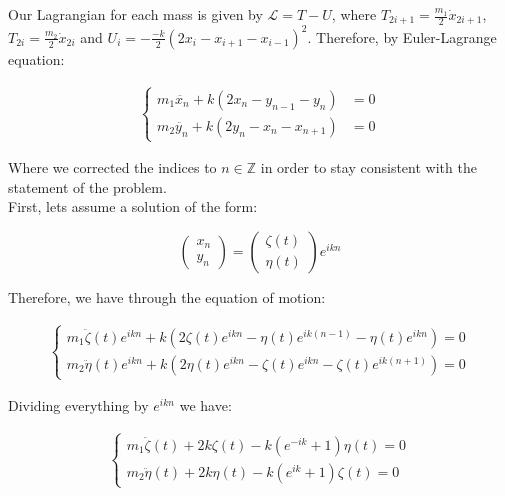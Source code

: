 \documentclass[
course = {{ITVO}},
quartile = {{1}},
assignment = 6,
name = {{Samir Salmen}},
studentnumber = {{NUSP: 11298636}},
email = {{samir.salmen@usp.br}},
firstexercise = 1
]{aga-homework}
\begin{document}
			
			
			
	\exercise
		\subexercise
			Our Lagrangian for each mass is given by $\mathcal{L} = T - U$, where $T_{2i+1} = \frac{m_1}{2}\dot{x}_{2i+1}$, $T_{2i} = \frac{m_2}{2}\dot{x}_{2i}$ and $U_i = -\frac{-k}{2}(2x_i - x_{i+1} - x_{i-1})^2$. Therefore, by Euler-Lagrange equation:
			
			
			\begin{align}
				\begin{cases}
					m_1\ddot{x_n} + k(2x_n - y_{n-1} - y_{n}) &= 0\\
					m_2\ddot{y_n} + k(2y_n - x_{n} - x_{n+1}) &= 0
				\end{cases}
			\end{align}
			
			Where we corrected the indices to $n \in \mathbb{Z}$ in order to stay consistent with the statement of the problem.\\
		\subexercise
			First, lets assume a solution of the form:
			
			\begin{equation}
				\begin{pmatrix}x_n\\y_n\end{pmatrix} =\begin{pmatrix}\zeta(t)\\\eta(t)\end{pmatrix} e^{ikn}
			\end{equation}
			
			Therefore, we have through the equation of motion:
			
			\begin{align}
				\begin{cases}	
					m_1\ddot{\zeta}(t)e^{ikn} + k(2\zeta(t)e^{ikn} - \eta(t)e^{ik(n-1)} - \eta(t)e^{ikn}) = 0\\
					m_2\ddot{\eta}(t)e^{ikn} + k(2\eta(t)e^{ikn} - \zeta(t)e^{ikn} - \zeta(t)e^{ik(n+1)}) = 0
				\end{cases}	
			\end{align}
			
			Dividing everything by $e^{ikn}$ we have:
			
			\begin{align}
				\begin{cases}
						m_1\ddot{\zeta}(t) + 2k\zeta(t)- k(e^{-ik} + 1)\eta(t) = 0\\
						m_2\ddot{\eta}(t) + 2k\eta(t) - k(e^{ik} + 1)\zeta(t) = 0
				\end{cases}
			\end{align}
			
\end{document}
